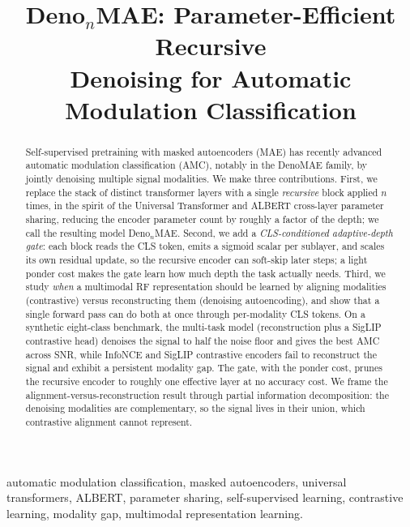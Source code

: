 \documentclass[conference]{IEEEtran}
\begin{document}
\title{Deno$_{n}$MAE: Parameter-Efficient Recursive\\
Denoising for Automatic Modulation Classification}

\author{
}

\maketitle

\begin{abstract}
Self-supervised pretraining with masked autoencoders (MAE) has recently advanced
automatic modulation classification (AMC), notably in the DenoMAE family, by
jointly denoising multiple signal modalities. We make three contributions. First,
we replace the stack of distinct transformer layers with a single \emph{recursive}
block applied $n$ times, in the spirit of the Universal Transformer and ALBERT
cross-layer parameter sharing, reducing the encoder parameter count by roughly a
factor of the depth; we call the resulting model \mbox{Deno$_{n}$MAE}. Second, we add a \emph{CLS-conditioned adaptive-depth
gate}: each block reads the CLS token, emits a sigmoid scalar per sublayer, and
scales its own residual update, so the recursive encoder can soft-skip later steps;
a light ponder cost makes the gate learn how much depth the task actually needs.
Third, we study \emph{when} a multimodal RF representation should be learned by
aligning modalities (contrastive) versus reconstructing them (denoising
autoencoding), and show that a single forward pass can do both at once through
per-modality CLS tokens. On a synthetic eight-class benchmark, the multi-task model (reconstruction
plus a SigLIP contrastive head) denoises the signal to half the noise floor and
gives the best AMC across SNR, while InfoNCE and SigLIP contrastive encoders fail
to reconstruct the signal and exhibit a persistent modality gap. The gate, with the
ponder cost, prunes the recursive encoder to roughly one effective layer at no
accuracy cost. We frame the alignment-versus-reconstruction result through partial
information decomposition: the denoising modalities are complementary, so the signal
lives in their union, which contrastive alignment cannot represent.
\end{abstract}

\begin{IEEEkeywords}
automatic modulation classification, masked autoencoders, universal transformers,
ALBERT, parameter sharing, self-supervised learning, contrastive learning,
modality gap, multimodal representation learning.
\end{IEEEkeywords}
\end{document}
